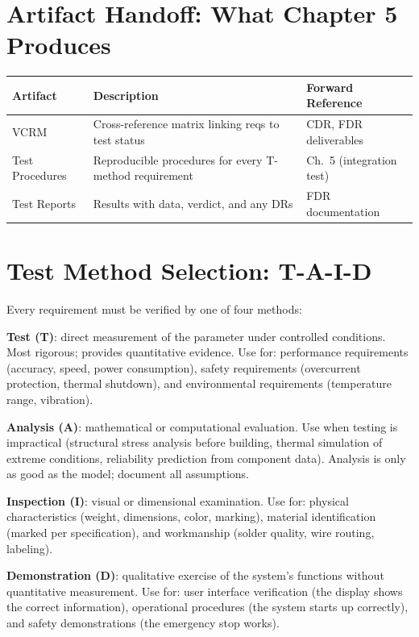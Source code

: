 \section{Artifact Handoff: What Chapter 5 Produces}
\begin{table}[htbp]\centering\small
\begin{tabularx}{\textwidth}{l X l}
\toprule
\textbf{Artifact} & \textbf{Description} & \textbf{Forward Reference} \\
\midrule
VCRM & Cross-reference matrix linking reqs to test status & CDR, FDR deliverables \\
Test Procedures & Reproducible procedures for every T-method requirement & Ch.~5 (integration test) \\
Test Reports & Results with data, verdict, and any DRs & FDR documentation \\
\bottomrule
\end{tabularx}
\end{table}


\section{Test Method Selection: T-A-I-D}
Every requirement must be verified by one of four methods:

\textbf{Test (T)}: direct measurement of the parameter under controlled conditions. Most rigorous; provides quantitative evidence. Use for: performance requirements (accuracy, speed, power consumption), safety requirements (overcurrent protection, thermal shutdown), and environmental requirements (temperature range, vibration).

\textbf{Analysis (A)}: mathematical or computational evaluation. Use when testing is impractical (structural stress analysis before building, thermal simulation of extreme conditions, reliability prediction from component data). Analysis is only as good as the model; document all assumptions.

\textbf{Inspection (I)}: visual or dimensional examination. Use for: physical characteristics (weight, dimensions, color, marking), material identification (marked per specification), and workmanship (solder quality, wire routing, labeling).

\textbf{Demonstration (D)}: qualitative exercise of the system's functions without quantitative measurement. Use for: user interface verification (the display shows the correct information), operational procedures (the system starts up correctly), and safety demonstrations (the emergency stop works).

